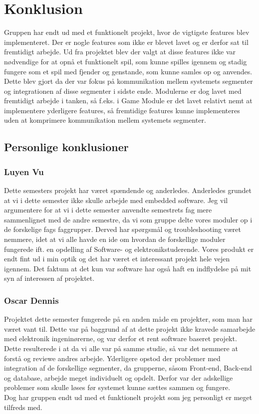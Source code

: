 \section{Konklusion}
Gruppen har endt ud med et funktionelt projekt, hvor de vigtigste features blev implementeret. Der er nogle features som ikke er blevet lavet og er derfor sat til fremtidigt arbejde. Ud fra projektet blev der valgt at disse features ikke var nødvendige for at opnå et funktionelt spil, som kunne spilles igennem og stadig fungere som et spil med fjender og genstande, som kunne samles op og anvendes.\\ Dette blev gjort da der var fokus på kommunikation mellem systemets segmenter og integrationen af disse segmenter i sidste ende. Modulerne er dog lavet med fremtidigt arbejde i tanken, så f.eks. i Game Module er det lavet relativt nemt at implementere yderligere features, så fremtidige features kunne implementeres uden at komprimere kommunikation mellem systemets segmenter.

\subsection{Personlige konklusioner}

\subsubsection{Luyen Vu}
Dette semesters projekt har været spændende og anderledes. Anderledes grundet at vi i dette semester ikke skulle arbejde med embedded software. Jeg vil argumentere for at vi i dette semester anvendte semestrets fag mere sammenlignet med de andre semestre, da vi som gruppe delte vores moduler op i de forskelige fags faggrupper. Derved har spørgsmål og troubleshooting været nemmere, idet at vi alle havde en ide om hvordan de forskellige moduler fungerede ift. en opdelling af Software- og elektronikstuderende. 
Vores produkt er endt fint ud i min optik og det har været et interessant projekt hele vejen igennem. Det faktum at det kun var software har også haft en indflydelse på mit syn af interessen af projektet.

\subsubsection{Oscar Dennis}
Projektet dette semester fungerede på en anden måde en projekter, som man har været vant til. Dette var på baggrund af at dette projekt ikke kravede samarbejde med elektronik ingeninørerne, og var derfor et rent software baseret projekt. Dette resulterede i at da vi alle var på samme studie, så var det nemmere at forstå og reviewe andres arbejde. Yderligere opstod der problemer med integration af de forskellige segmenter, da grupperne, såsom Front-end, Back-end og database, arbejde meget individuelt og opdelt. Derfor var der adskellige problemer som skulle løses før systemet kunne sættes sammen og fungere.\\
Dog har gruppen endt ud med et funktionelt projekt som jeg personligt er meget tilfreds med.

